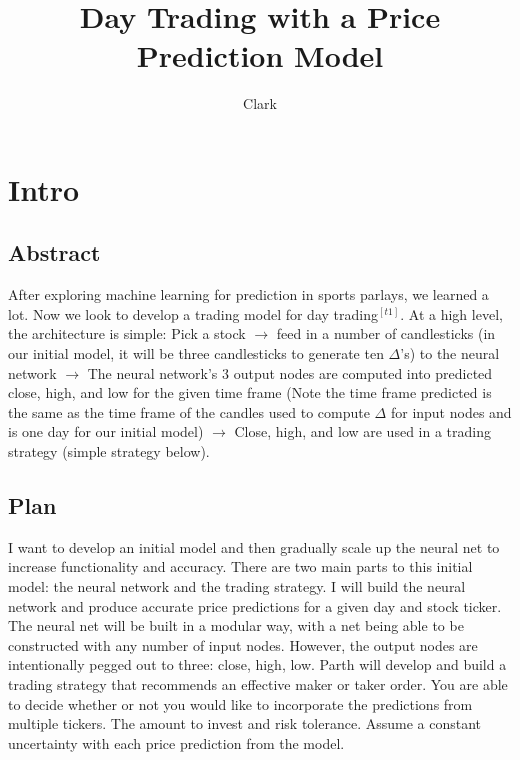 \documentclass{article}
\title{Day Trading with a Price Prediction Model}
\author{Clark}
\date{ }
\begin{document}
\maketitle

\tableofcontents %

\clearpage

\section{Intro}
\subsection{Abstract}
After exploring machine learning for prediction in sports parlays, we learned a lot. Now we look to develop a trading model for day trading$^{[t1]}$. At a high level, the architecture is simple: Pick a stock $\rightarrow$ feed in a number of candlesticks (in our initial model, it will be three candlesticks to generate ten $\Delta$'s) to the neural network $\rightarrow$ The neural network's 3 output nodes are computed into predicted close, high, and low for the given time frame (Note the time frame predicted is the same as the time frame of the candles used to compute $\Delta$ for input nodes and is one day for our initial model) $\rightarrow$ Close, high, and low are used in a trading strategy (simple strategy below). 

\subsection{Plan}
I want to develop an initial model and then gradually scale up the neural net to increase functionality and accuracy. There are two main parts to this initial model: the neural network and the trading strategy. I will build the neural network and produce accurate price predictions for a given day and stock ticker. The neural net will be built in a modular way, with a net being able to be constructed with any number of input nodes. However, the output nodes are intentionally pegged out to three: close, high, low. Parth will develop and build a trading strategy that recommends an effective maker or taker order. You are able to decide whether or not you would like to incorporate the predictions from multiple tickers. The amount to invest and risk tolerance. Assume a constant uncertainty with each price prediction from the model.

\clearpage
\end{document}
